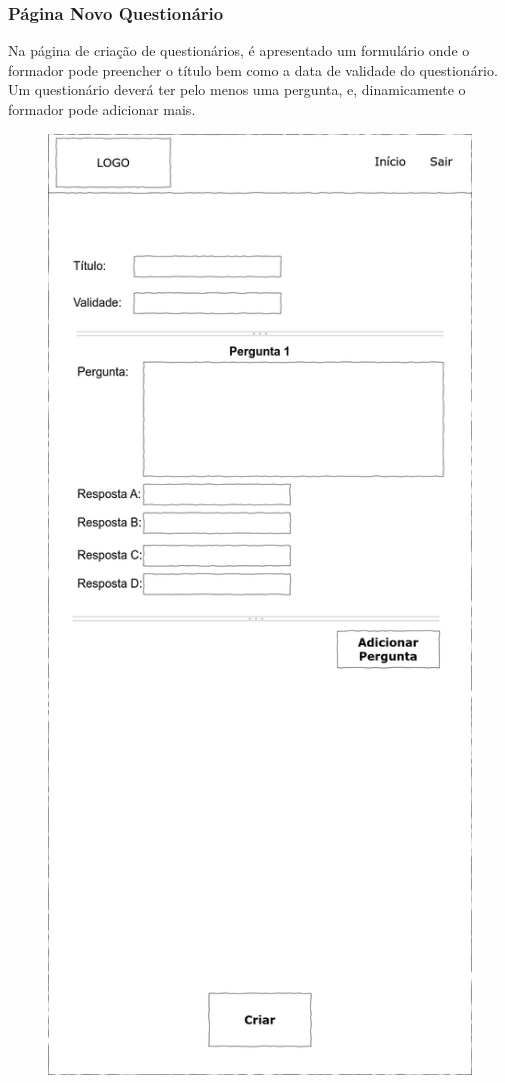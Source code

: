 \documentclass[12pt,a4paper,final]{article}
\begin{document}
    \subsubsection{Página Novo Questionário}
    Na página de criação de questionários, é apresentado um formulário onde o formador pode preencher o título bem como a data de validade do questionário.
    Um questionário deverá ter pelo menos uma pergunta, e, dinamicamente o formador pode adicionar mais.

    \begin{figure}[H]
        \centering
        \includegraphics[width=\textwidth,height=0.9\textheight,keepaspectratio]{wireframes/questionarios.wireframes-formador-novo-questionario-mobile.drawio}

\end{figure}
\end{document}
